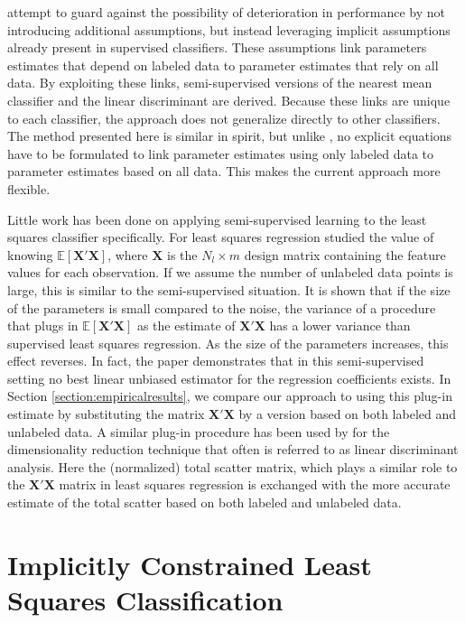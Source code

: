 \documentclass[smallcondensed]{svjour3}
\begin{document}
\cite{Loog2010,Loog2013a} attempt to guard against the possibility of deterioration in performance by not introducing additional assumptions, but instead leveraging implicit assumptions already present in supervised classifiers. These assumptions link parameters estimates that depend on labeled data to parameter estimates that rely on all data. By exploiting these links, semi-supervised versions of the nearest mean classifier and the linear discriminant are derived. Because these links are unique to each classifier, the approach does not generalize directly to other classifiers. The method presented here is similar in spirit, but unlike \cite{Loog2010,Loog2013a}, no explicit equations have to be formulated to link parameter estimates using only labeled data to parameter estimates based on all data. This makes the current approach more flexible.

Little work has been done on applying semi-supervised learning to the least squares classifier specifically. For least squares regression \cite{Shaffer1991} studied the value of knowing $\mathbb{E}[\mathbf{X}'\mathbf{X}]$, where $\mathbf{X}$ is the $N_l \times m$ design matrix containing the feature values for each observation. If we assume the number of unlabeled data points is large, this is similar to the semi-supervised situation. It is shown that if the size of the parameters is small compared to the noise, the variance of a procedure that plugs in $\mathbb{E}[\mathbf{X}'\mathbf{X}]$ as the estimate of $\mathbf{X}'\mathbf{X}$ has a lower variance than supervised least squares regression.  As the size of the parameters increases, this effect reverses. In fact, the paper demonstrates that in this semi-supervised setting no best linear unbiased estimator for the regression coefficients exists. In Section \ref{section:empiricalresults}, we compare our approach to using this plug-in estimate by substituting the matrix $\mathbf{X}'\mathbf{X}$ by a version based on both labeled and unlabeled data. 
A similar plug-in procedure has been used by \cite{Fan2008} for the dimensionality reduction technique that often is referred to as linear discriminant analysis. Here the (normalized) total scatter matrix, which plays a similar role to the $\mathbf{X}'\mathbf{X}$ matrix in least squares regression is exchanged with the more accurate estimate of the total scatter based on both labeled and unlabeled data.

\section{Implicitly Constrained Least Squares Classification}
\end{document}
